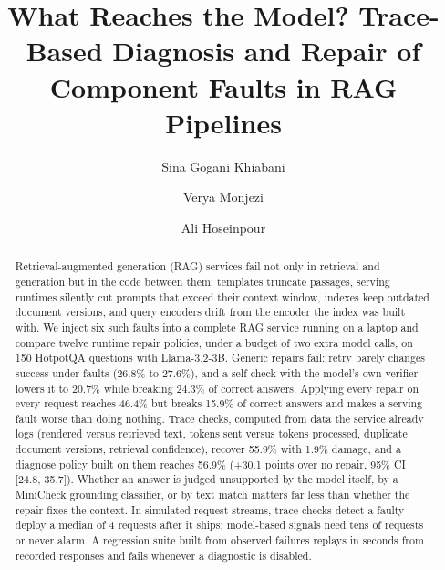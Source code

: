 \documentclass[sigconf,review=false,anonymous=false]{acmart}
\begin{document}
\title{What Reaches the Model? Trace-Based Diagnosis and Repair of Component Faults in RAG Pipelines}

\author{Sina Gogani Khiabani}
\author{Verya Monjezi}
\author{Ali Hoseinpour}

\begin{abstract}
Retrieval-augmented generation (RAG) services fail not only in retrieval and generation but in
the code between them: templates truncate passages, serving runtimes silently cut prompts that
exceed their context window, indexes keep outdated document versions, and query encoders drift
from the encoder the index was built with. We inject six such faults into a complete RAG service
running on a laptop and compare twelve runtime repair policies, under a budget of two extra model
calls, on 150 HotpotQA questions with Llama-3.2-3B. Generic repairs fail: retry barely changes
success under faults (26.8\% to 27.6\%), and a self-check with the model's own verifier lowers it to
20.7\% while breaking 24.3\% of correct answers. Applying every repair on every request reaches
46.4\% but breaks 15.9\% of correct answers and makes a serving fault worse than doing nothing.
Trace checks, computed from data the service already logs (rendered versus retrieved text, tokens
sent versus tokens processed, duplicate document versions, retrieval confidence), recover 55.9\%
with 1.9\% damage, and a diagnose policy built on them reaches 56.9\% (+30.1 points over no repair,
95\% CI [24.8, 35.7]). Whether an answer is judged unsupported by the model itself, by a MiniCheck
grounding classifier, or by text match matters far less than whether the repair fixes the context.
In simulated request streams, trace checks detect a faulty deploy a median of 4 requests after it
ships; model-based signals need tens of requests or never alarm. A regression suite built from
observed failures replays in seconds from recorded responses and fails whenever a diagnostic is
disabled.
\end{abstract}


\maketitle









\end{document}
